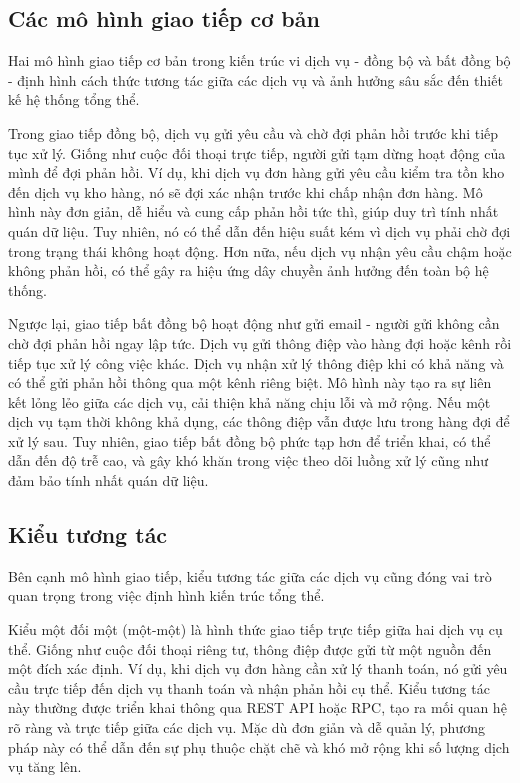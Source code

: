 \subsection{Các mô hình giao tiếp cơ bản}
Hai mô hình giao tiếp cơ bản trong kiến trúc vi dịch vụ - đồng bộ và bất đồng bộ - định hình cách thức tương tác giữa các dịch vụ và ảnh hưởng sâu sắc đến thiết kế hệ thống tổng thể.

Trong giao tiếp đồng bộ, dịch vụ gửi yêu cầu và chờ đợi phản hồi trước khi tiếp tục xử lý. Giống như cuộc đối thoại trực tiếp, người gửi tạm dừng hoạt động của mình để đợi phản hồi. Ví dụ, khi dịch vụ đơn hàng gửi yêu cầu kiểm tra tồn kho đến dịch vụ kho hàng, nó sẽ đợi xác nhận trước khi chấp nhận đơn hàng. Mô hình này đơn giản, dễ hiểu và cung cấp phản hồi tức thì, giúp duy trì tính nhất quán dữ liệu. Tuy nhiên, nó có thể dẫn đến hiệu suất kém vì dịch vụ phải chờ đợi trong trạng thái không hoạt động. Hơn nữa, nếu dịch vụ nhận yêu cầu chậm hoặc không phản hồi, có thể gây ra hiệu ứng dây chuyền ảnh hưởng đến toàn bộ hệ thống.

Ngược lại, giao tiếp bất đồng bộ hoạt động như gửi email - người gửi không cần chờ đợi phản hồi ngay lập tức. Dịch vụ gửi thông điệp vào hàng đợi hoặc kênh rồi tiếp tục xử lý công việc khác. Dịch vụ nhận xử lý thông điệp khi có khả năng và có thể gửi phản hồi thông qua một kênh riêng biệt. Mô hình này tạo ra sự liên kết lỏng lẻo giữa các dịch vụ, cải thiện khả năng chịu lỗi và mở rộng. Nếu một dịch vụ tạm thời không khả dụng, các thông điệp vẫn được lưu trong hàng đợi để xử lý sau. Tuy nhiên, giao tiếp bất đồng bộ phức tạp hơn để triển khai, có thể dẫn đến độ trễ cao, và gây khó khăn trong việc theo dõi luồng xử lý cũng như đảm bảo tính nhất quán dữ liệu.

\subsection{Kiểu tương tác}
Bên cạnh mô hình giao tiếp, kiểu tương tác giữa các dịch vụ cũng đóng vai trò quan trọng trong việc định hình kiến trúc tổng thể.

Kiểu một đối một (một-một) là hình thức giao tiếp trực tiếp giữa hai dịch vụ cụ thể. Giống như cuộc đối thoại riêng tư, thông điệp được gửi từ một nguồn đến một đích xác định. Ví dụ, khi dịch vụ đơn hàng cần xử lý thanh toán, nó gửi yêu cầu trực tiếp đến dịch vụ thanh toán và nhận phản hồi cụ thể. Kiểu tương tác này thường được triển khai thông qua REST API hoặc RPC, tạo ra mối quan hệ rõ ràng và trực tiếp giữa các dịch vụ. Mặc dù đơn giản và dễ quản lý, phương pháp này có thể dẫn đến sự phụ thuộc chặt chẽ và khó mở rộng khi số lượng dịch vụ tăng lên.

